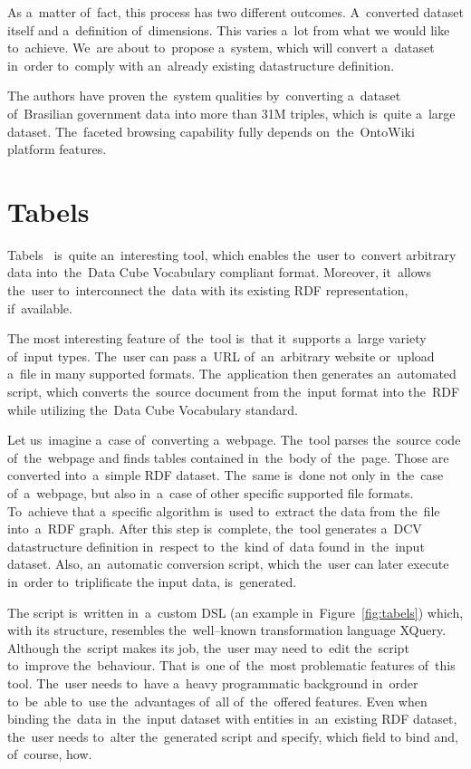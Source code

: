 As a~matter of~fact, this process has two different outcomes. A~converted 
dataset itself and a~definition of~dimensions. This varies a~lot from what 
we would like to~achieve. We~are about to~propose a~system, which will convert a~dataset in~order to~comply with an~already existing datastructure definition.

The authors have proven the~system qualities by~converting a~dataset of~Brasilian government data
into more than 31M triples, which is~quite a~large dataset. The~faceted browsing
capability fully depends on~the~OntoWiki platform features.

\section{Tabels}
\label{rw:tabels}
Tabels~\cite{tabels-web} is~quite an~interesting tool, which enables the~user to~convert arbitrary data into~the~Data Cube Vocabulary compliant format. 
Moreover, it~allows the~user to~interconnect the~data with its existing RDF 
representation, if~available.

The most interesting feature of~the~tool is~that it~supports a~large variety of~input types. The~user can pass a~URL of~an~arbitrary website or~upload a~file 
in many supported formats. The~application then generates an~automated script, which converts the~source document from the~input format 
into the~RDF while utilizing the~Data Cube Vocabulary standard.

Let us~imagine a~case of~converting a~webpage. The~tool parses the~source code of~the~webpage and 
finds tables contained in~the~body of~the~page. Those are converted into~a~simple
RDF dataset. The~same is~done not only in~the~case of~a~webpage, but also in~a~case
of other specific supported file formats. To~achieve that a~specific algorithm is~used to~extract
the data from the~file into~a~RDF graph. After this step is~complete, the~tool generates a~DCV
datastructure definition in~respect to~the~kind of~data found in~the~input dataset.
Also, an~automatic conversion script, which the~user can later execute in~order to~triplificate
the input data, is~generated.

The script is~written in~a~custom DSL (an example in~Figure~\ref{fig:tabels}) which,
with its structure, resembles the~well--known
transformation language XQuery. Although the~script makes its job, the~user may need to~edit the~script to~improve the~behaviour. That is~one of~the~most problematic features of~this tool. The~user needs to~have a~heavy programmatic 
background in~order to~be~able to~use the~advantages of~all of~the~offered features. 
Even when binding the~data in~the~input dataset with entities in~an~existing RDF 
dataset, the~user needs to~alter the~generated script and specify, which field 
to bind and, of~course, how.

